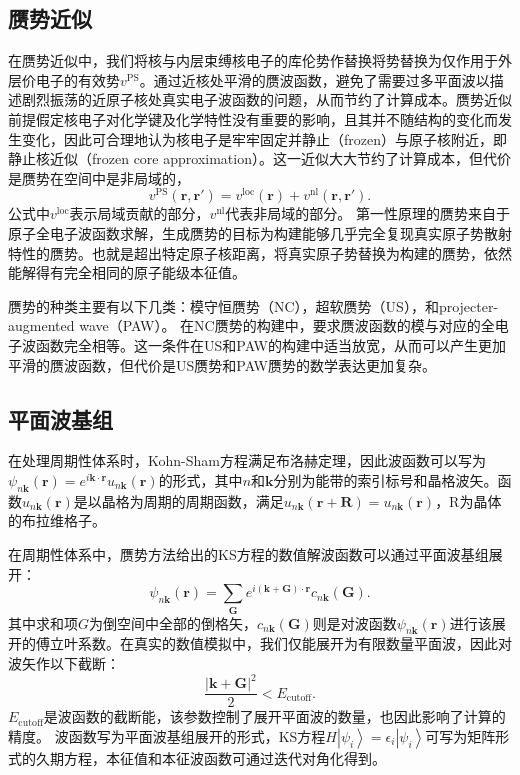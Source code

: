 \subsection{赝势近似}
在赝势近似中，我们将核与内层束缚核电子的库伦势作替换将势替换为仅作用于外层价电子的有效势$v^\mathrm{PS}$。通过近核处平滑的赝波函数，避免了需要过多平面波以描述剧烈振荡的近原子核处真实电子波函数的问题，从而节约了计算成本。赝势近似前提假定核电子对化学键及化学特性没有重要的影响，且其并不随结构的变化而发生变化，因此可合理地认为核电子是牢牢固定并静止（frozen）与原子核附近，即静止核近似（frozen core approximation）。这一近似大大节约了计算成本，但代价是赝势在空间中是非局域的，
\begin{equation}
  v^{\mathrm{PS}}(\bm{r},\bm{r'}) = v^{\mathrm{loc}}(\bm{r}) + v^{\mathrm{nl}}(\bm{r},\bm{r'}).
\end{equation}
公式中$v^\mathrm{loc}$表示局域贡献的部分，$v^\mathrm{nl}$代表非局域的部分。
第一性原理的赝势来自于原子全电子波函数求解，生成赝势的目标为构建能够几乎完全复现真实原子势散射特性的赝势。也就是超出特定原子核距离，将真实原子势替换为构建的赝势，依然能解得有完全相同的原子能级本征值。

赝势的种类主要有以下几类：模守恒赝势（NC）\cite{hamann1979norm}，超软赝势（US）\cite{vanderbilt1990soft}，和projecter-augmented wave（PAW）\cite{blochl1994projector}。 在NC赝势的构建中，要求赝波函数的模与对应的全电子波函数完全相等。这一条件在US和PAW的构建中适当放宽，从而可以产生更加平滑的赝波函数，但代价是US赝势和PAW赝势的数学表达更加复杂。

\subsection{平面波基组}
在处理周期性体系时，Kohn-Sham方程满足布洛赫定理，因此波函数可以写为$\psi_{n\bm{k}}(\bm{r})=e^{i\bm{k}\cdot \bm{r}} u_{n\bm{k}}(\bm{r})$的形式，其中$n$和$\bm{k}$分别为能带的索引标号和晶格波矢。函数$u_{n\bm{k}}(\bm{r})$是以晶格为周期的周期函数，满足$u_{n\bm{k}}(\bm{r}+\bm{R})=u_{n\bm{k}}(\bm{r})$，R为晶体的布拉维格子。

在周期性体系中，赝势方法给出的KS方程的数值解波函数可以通过平面波基组展开：
\begin{equation}
  \psi_{n\bm{k}}(\bm{r}) = \sum_{\bm{G}}e^{i(\bm{k}+\bm{G})\cdot \bm{r}}c_{n\bm{k}}(\bm{G}).
\end{equation}
其中求和项$G$为倒空间中全部的倒格矢，$c_{n\bm{k}}(\bm{G})$则是对波函数$\psi_{n\bm{k}}(\bm{r})$进行该展开的傅立叶系数。在真实的数值模拟中，我们仅能展开为有限数量平面波，因此对波矢作以下截断：
\begin{equation}
  \frac{|\bm{k} + \bm{G}|^2}{2} < E_{\mathrm{cutoff}}.
\end{equation}
$E_{\mathrm{cutoff}}$是波函数的截断能，该参数控制了展开平面波的数量，也因此影响了计算的精度。
波函数写为平面波基组展开的形式，KS方程$H\left|\psi_i\right>=\epsilon_i\left|\psi_i\right>$可写为矩阵形式的久期方程，本征值和本征波函数可通过迭代对角化得到。

